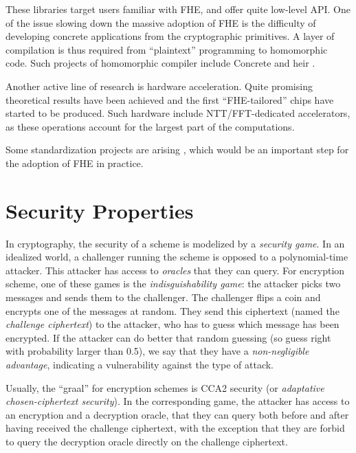 These libraries target users familiar with FHE, and offer quite low-level API. One of the issue slowing down the massive adoption of FHE is the difficulty of developing concrete applications from the cryptographic primitives. A layer of compilation is thus required from ``plaintext'' programming to homomorphic code. Such projects of homomorphic compiler include Concrete \cite{Concrete} and heir \cite{HEIR}.


Another active line of research is hardware acceleration. Quite promising theoretical results have been achieved \cite{TCHES:GVPHMS23, EPRINT:BBTV23a, EPRINT:CPBFSJ23, EPRINT:KHMR24} and the first ``FHE-tailored'' chips have started to be produced. Such hardware include NTT/FFT-dedicated accelerators, as these operations account for the largest part of the computations. 


Some standardization projects are arising \cite{HomomorphicEncryptionSecurityStandard, call_nist}, which would be an important step for the adoption of FHE in practice.
 	


\section{Security Properties}


In cryptography, the security of a scheme is modelized by a \textit{security game}. In an idealized world, a challenger running the scheme is opposed to a polynomial-time attacker. This attacker has access to \textit{oracles} that they can query. For encryption scheme, one of these games is the \textit{indisguishability game}: the attacker picks two messages and sends them to the challenger. The challenger flips a coin and encrypts one of the messages at random. They send this ciphertext (named the \textit{challenge ciphertext}) to the attacker, who has to guess which message has been encrypted. If the attacker can do better that random guessing (so guess right with probability larger than 0.5), we say that they have a \textit{non-negligible advantage}, indicating a vulnerability against the type of attack.

Usually, the ``graal'' for encryption schemes is \textsf{CCA2} security (or \textit{adaptative chosen-ciphertext security}). In the corresponding game, the attacker has access to an encryption and a decryption oracle, that they can query both before and after having received the challenge ciphertext, with the exception that they are forbid to query the decryption oracle directly on the challenge ciphertext.



